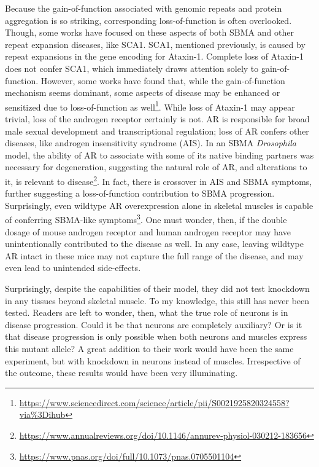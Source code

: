 Because the gain-of-function associated with genomic repeats and protein aggregation is so striking, corresponding loss-of-function is often overlooked. Though, some works have focused on these aspects of both SBMA and other repeat expansion diseases, like SCA1. SCA1, mentioned previously, is caused by repeat expansions in the gene encoding for Ataxin-1. Complete loss of Ataxin-1 does not confer SCA1, which immediately draws attention solely to gain-of-function. However, some works have found that, while the gain-of-function mechanism seems dominant, some aspects of disease may be enhanced or sensitized due to loss-of-function as well\footnote{\url{https://www.sciencedirect.com/science/article/pii/S0021925820324558?via\%3Dihub}}. While loss of Ataxin-1 may appear trivial, loss of the androgen receptor certainly is not. AR is responsible for broad male sexual development and transcriptional regulation; loss of AR confers other diseases, like androgen insensitivity syndrome (AIS). In an SBMA \textit{Drosophila} model, the ability of AR to associate with some of its native binding partners was necessary for degeneration, suggesting the natural role of AR, and alterations to it, is relevant to disease\footnote{\url{https://www.annualreviews.org/doi/10.1146/annurev-physiol-030212-183656}}. In fact, there is crossover in AIS and SBMA symptoms, further suggesting a loss-of-function contribution to SBMA progression. Surprisingly, even wildtype AR overexpression alone in skeletal muscles is capable of conferring SBMA-like symptoms\footnote{\url{https://www.pnas.org/doi/full/10.1073/pnas.0705501104}}. One must wonder, then, if the double dosage of mouse androgen receptor and human androgen receptor may have unintentionally contributed to the disease as well. In any case, leaving wildtype AR intact in these mice may not capture the full range of the disease, and may even lead to unintended side-effects.\newline

Surprisingly, despite the capabilities of their model, they did not test knockdown in any tissues beyond skeletal muscle. To my knowledge, this still has never been tested. Readers are left to wonder, then, what the true role of neurons is in disease progression. Could it be that neurons are completely auxiliary? Or is it that disease progression is only possible when both neurons and muscles express this mutant allele? A great addition to their work would have been the same experiment, but with knockdown in neurons instead of muscles. Irrespective of the outcome, these results would have been very illuminating.\newline

